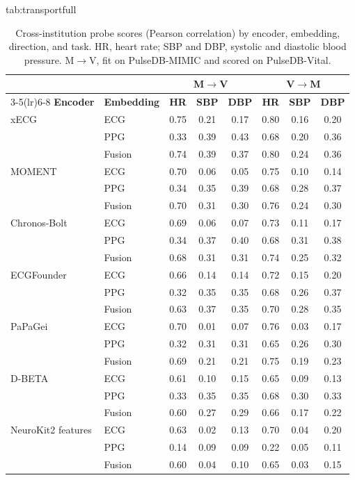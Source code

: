 \documentclass[pmlr,twocolumn,10pt]{jmlr}
\newcommand{\domainmodel}{xECG}
\newcommand{\tsmodel}{MOMENT}
\begin{document}
\begin{table}[!t]
\floatconts
  {tab:transportfull}
  {\caption{Cross-institution probe scores (Pearson correlation) by encoder, embedding, direction, and task. HR, heart rate; SBP and DBP, systolic and diastolic blood pressure. M$\to$V, fit on PulseDB-MIMIC and scored on PulseDB-Vital.}}
  {\small\setlength{\tabcolsep}{4pt}
  \begin{tabular*}{\linewidth}{@{\extracolsep{\fill}}llcccccc@{}}
  \toprule
  & & \multicolumn{3}{c}{\textbf{M$\to$V}} & \multicolumn{3}{c}{\textbf{V$\to$M}} \\
  \cmidrule(lr){3-5}\cmidrule(lr){6-8}
  \textbf{Encoder} & \textbf{Embedding} & \textbf{HR} & \textbf{SBP} & \textbf{DBP} & \textbf{HR} & \textbf{SBP} & \textbf{DBP} \\
  \midrule
  \domainmodel{} & ECG & 0.75 & 0.21 & 0.17 & 0.80 & 0.16 & 0.20 \\
   & PPG & 0.33 & 0.39 & 0.43 & 0.68 & 0.20 & 0.36 \\
   & Fusion & 0.74 & 0.39 & 0.37 & 0.80 & 0.24 & 0.36 \\
  \tsmodel{} & ECG & 0.70 & 0.06 & 0.05 & 0.75 & 0.10 & 0.14 \\
   & PPG & 0.34 & 0.35 & 0.39 & 0.68 & 0.28 & 0.37 \\
   & Fusion & 0.70 & 0.31 & 0.30 & 0.76 & 0.24 & 0.30 \\
  Chronos-Bolt & ECG & 0.69 & 0.06 & 0.07 & 0.73 & 0.11 & 0.17 \\
   & PPG & 0.34 & 0.37 & 0.40 & 0.68 & 0.31 & 0.38 \\
   & Fusion & 0.68 & 0.31 & 0.31 & 0.74 & 0.25 & 0.32 \\
  ECGFounder & ECG & 0.66 & 0.14 & 0.14 & 0.72 & 0.15 & 0.20 \\
   & PPG & 0.32 & 0.35 & 0.35 & 0.68 & 0.26 & 0.37 \\
   & Fusion & 0.63 & 0.37 & 0.35 & 0.70 & 0.28 & 0.35 \\
  PaPaGei & ECG & 0.70 & 0.01 & 0.07 & 0.76 & 0.03 & 0.17 \\
   & PPG & 0.32 & 0.31 & 0.31 & 0.65 & 0.26 & 0.30 \\
   & Fusion & 0.69 & 0.21 & 0.21 & 0.75 & 0.19 & 0.23 \\
  D-BETA & ECG & 0.61 & 0.10 & 0.15 & 0.65 & 0.09 & 0.13 \\
   & PPG & 0.33 & 0.35 & 0.35 & 0.68 & 0.30 & 0.33 \\
   & Fusion & 0.60 & 0.27 & 0.29 & 0.66 & 0.17 & 0.22 \\
  NeuroKit2 features & ECG & 0.63 & 0.02 & 0.13 & 0.70 & 0.04 & 0.20 \\
   & PPG & 0.14 & 0.09 & 0.09 & 0.22 & 0.05 & 0.11 \\
   & Fusion & 0.60 & 0.04 & 0.10 & 0.65 & 0.03 & 0.15 \\
  \bottomrule
  \end{tabular*}}
\end{table}
\end{document}
